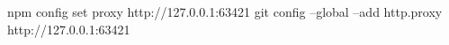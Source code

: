 npm config set proxy http://127.0.0.1:63421
git config --global --add http.proxy http://127.0.0.1:63421